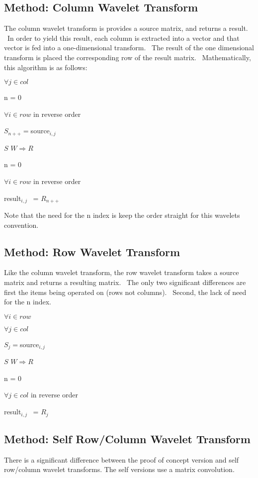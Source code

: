 \subsection{\protect\bigskip Method: Column Wavelet Transform}

The column wavelet transform is provides a source matrix, and returns a
result. \ In order to yield this result, each column is extracted into a
vector and that vector is fed into a one-dimensional transform. \ The result
of the one dimensional transform is placed the corresponding row of the
result matrix. \ Mathematically, this algorithm is as follows:

\qquad $\forall j\in col$

\qquad \qquad n = 0

\qquad \qquad $\forall i\in row$ in reverse order

\qquad \qquad \qquad $S_{n++}=$source$_{i,j}$

\qquad \qquad $S$ ${W}{\Rightarrow }R$

\qquad \qquad n = 0

\qquad \qquad $\forall i\in row$ in reverse order

\qquad \qquad \qquad result$_{i,j}$ \ = $R_{n++}$

\bigskip Note that the need for the n index is keep the order straight for
this wavelets convention. \ 

\bigskip

\subsection{Method: Row Wavelet Transform}

\bigskip Like the column wavelet transform, the row wavelet transform takes
a source matrix and returns a resulting matrix. \ The only two significant
differences are first the items being operated on (rows not columns). \
Second, the lack of need for the n index. \ 

\qquad $\forall i\in row$

\qquad \qquad $\forall j\in col$

\qquad \qquad \qquad $S_{j}=$source$_{i,j}$

\qquad \qquad $S$ ${W}{\Rightarrow }R$

\qquad \qquad n = 0

\qquad \qquad $\forall j\in col$ in reverse order

\qquad \qquad \qquad result$_{i,j}$ \ = $R_{j}$

\subsection {Method: Self Row/Column Wavelet Transform}
There is a significant difference between the proof of concept version and self row/column wavelet transforms.  The self versions use a matrix convolution.  




